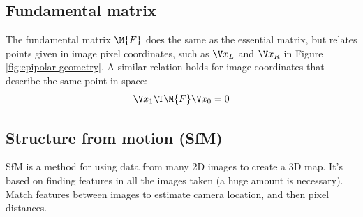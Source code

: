 \subsection{Fundamental matrix}
The fundamental matrix $\M{F}$ does the same as the essential matrix, but relates points given in image pixel coordinates, such as $\x_L$ and $\x_R$ in Figure \ref{fig:epipolar-geometry}. A similar relation holds for image coordinates that describe the same point in space:
\begin{equation}
    \x_1\T \M{F} \x_0 = 0
\end{equation}

\subsection{Structure from motion (SfM)}
SfM is a method for using data from many 2D images to create a 3D map. It's based on finding features in all the images taken (a huge amount is necessary). Match features between images to estimate camera location, and then pixel distances.
